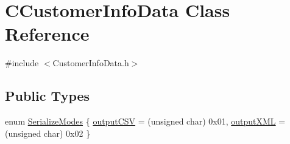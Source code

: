 \hypertarget{classCCustomerInfoData}{
\section{CCustomerInfoData Class Reference}
\label{classCCustomerInfoData}
}


{\ttfamily \#include $<$CustomerInfoData.h$>$}

\subsection*{Public Types}
\begin{DoxyCompactItemize}
\item 
enum \hyperlink{classCCustomerInfoData_afe8407ab593ac7caf8577439c22af849}{SerializeModes} \{ \hyperlink{classCCustomerInfoData_afe8407ab593ac7caf8577439c22af849a88f455d6bd3966c10c9e68b4001e5b84}{outputCSV} =  (unsigned char) 0x01, 
\hyperlink{classCCustomerInfoData_afe8407ab593ac7caf8577439c22af849a8b150883e3f025a1ead3ce167b587be4}{outputXML} =  (unsigned char) 0x02
 \}
\end{DoxyCompactItemize}
